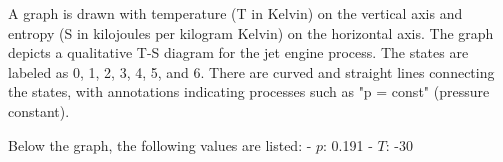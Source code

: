 A graph is drawn with temperature (T in Kelvin) on the vertical axis and entropy (S in kilojoules per kilogram Kelvin) on the horizontal axis. The graph depicts a qualitative T-S diagram for the jet engine process. The states are labeled as 0, 1, 2, 3, 4, 5, and 6. There are curved and straight lines connecting the states, with annotations indicating processes such as "p = const" (pressure constant).  

Below the graph, the following values are listed:  
- \( p \): 0.191  
- \( T \): -30